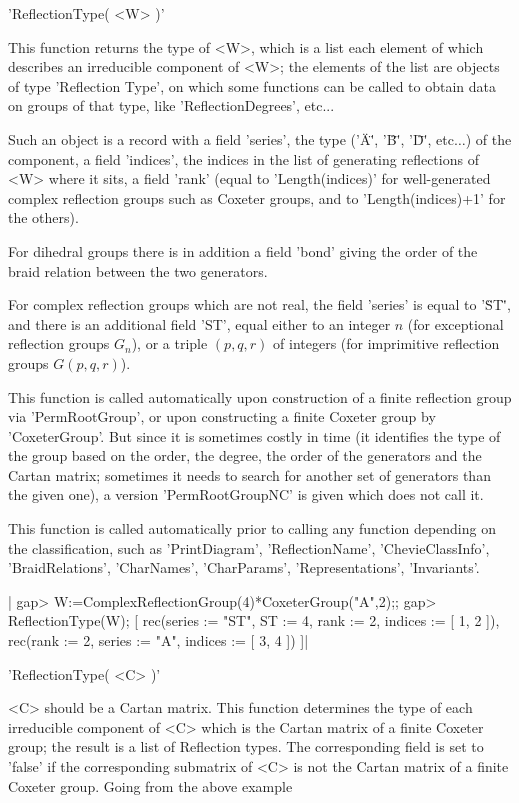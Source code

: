 'ReflectionType( <W> )'

This function returns the type of <W>, which is a list each element of which
describes an irreducible  component of <W>; the  elements of the list  are
objects of type 'Reflection Type', on which some functions can be called
to obtain data on groups of that type, like 'ReflectionDegrees', etc...

Such  an  object  is  a  record  with  a field 'series', the type ('\"A\"',
'\"B\"',  '\"D\"', etc$\ldots$)  of the  component, a  field 'indices', the
indices in the list of generating reflections of <W> where it sits, a field
'rank'  (equal to  'Length(indices)' for  well-generated complex reflection
groups such as Coxeter groups, and to 'Length(indices)+1' for the others).

For dihedral groups there is in addition a field 'bond' giving the order of
the braid relation between the two generators.

For  complex reflection  groups which  are not  real, the field 'series' is
equal  to '\"ST\"', and there is an  additional field 'ST', equal either to
an  integer  $n$  (for  exceptional  reflection  groups $G_n$), or a triple
$(p,q,r)$ of integers (for imprimitive reflection groups $G(p,q,r)$).

This  function  is  called  automatically  upon  construction  of  a finite
reflection group via 'PermRootGroup', or upon constructing a finite Coxeter
group  by  'CoxeterGroup'.  But  since  it  is sometimes costly in time (it
identifies  the type of the group based on the order, the degree, the order
of  the generators and the Cartan matrix;  sometimes it needs to search for
another  set of generators than the given one), a version 'PermRootGroupNC'
is given which does not call it.

This  function  is  called  automatically  prior  to  calling  any function
depending  on the classification, such as 'PrintDiagram', 'ReflectionName',
'ChevieClassInfo',      'BraidRelations',    'CharNames',     'CharParams',
'Representations', 'Invariants'.

|    gap> W:=ComplexReflectionGroup(4)*CoxeterGroup("A",2);;
    gap> ReflectionType(W);
    [ rec(series  := "ST",
          ST      := 4,
          rank    := 2,
          indices := [ 1, 2 ]), rec(rank    := 2,
          series  := "A",
          indices := [ 3, 4 ]) ]|

'ReflectionType( <C> )'

<C>  should be a Cartan  matrix. This function determines  the type of each
irreducible component of <C> which is the Cartan matrix of a finite Coxeter
group; the result is a list of Reflection types. The corresponding field is
set  to 'false'  if the  corresponding submatrix  of <C>  is not the Cartan
matrix of a finite Coxeter group. Going from the above example\:

